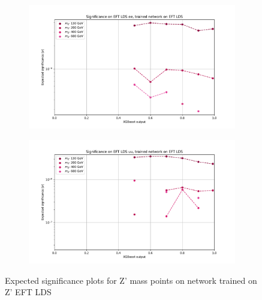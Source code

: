 \documentclass[12pt, a4paper]{book}
\begin{document}
\begin{figure}[!ht]
	\centering
	\begin{subfigure}[b]{0.49\textwidth}
      \centering
      \includegraphics[width=1\textwidth]{XGBoost/EFT_LDS/EXP_SIG_ee.pdf}
      \end{subfigure}
   \hfill
   \begin{subfigure}[b]{0.49\textwidth}
      \centering
      \includegraphics[width=1\textwidth]{XGBoost/EFT_LDS/EXP_SIG_uu.pdf}
      \end{subfigure}
   \caption{Expected significance plots for Z' mass points on network trained on Z' EFT LDS}\label{fig:EFT_LDS_exp_sig}
\end{figure}
\end{document}
